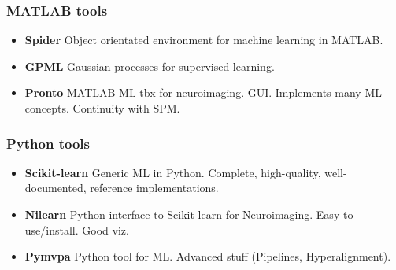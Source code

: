 \begin{frame}
\frametitle{MATLAB tools}
\begin{itemize}
\item \textbf{Spider} Object orientated environment for machine learning in MATLAB.
\item \textbf{GPML} Gaussian processes for supervised learning. %
\item \textbf{Pronto} MATLAB ML tbx for neuroimaging. GUI. Implements many ML concepts. Continuity with SPM.
\end{itemize}
\end{frame}

\begin{frame}
\frametitle{Python tools}
\begin{itemize}
\item \textbf{Scikit-learn} Generic ML in Python. Complete,
  high-quality, well-documented, reference implementations.
\item \textbf{Nilearn} Python interface to Scikit-learn for
  Neuroimaging. Easy-to-use/install. Good viz.
\item \textbf{Pymvpa} Python tool for ML. Advanced stuff
  (Pipelines, Hyperalignment).
\end{itemize}
\end{frame}

